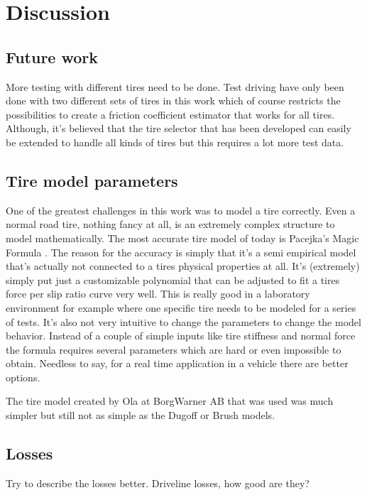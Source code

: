 \chapter{Discussion}

\section{Future work}
More testing with different tires need to be done. Test driving have only been done with two different sets of tires in this work which of course restricts the possibilities to create a friction coefficient estimator that works for all tires. Although, it's believed that the tire selector that has been developed can easily be extended to handle all kinds of tires but this requires a lot more test data.

\section{Tire model parameters}
One of the greatest challenges in this work was to model a tire correctly. Even a normal road tire, nothing fancy at all, is an extremely complex structure to model mathematically. The most accurate tire model of today is Pacejka's Magic Formula \cite{pacejka}. The reason for the accuracy is simply that it's a semi empirical model that's actually not connected to a tires physical properties at all. It's (extremely) simply put just a customizable polynomial that can be adjusted to fit a tires force per slip ratio curve very well. This is really good in a laboratory environment for example where one specific tire needs to be modeled for a series of tests. It's also not very intuitive to change the parameters to change the model behavior. Instead of a couple of simple inputs like tire stiffness and normal force the formula requires several parameters which are hard or even impossible to obtain. Needless to say, for a real time application in a vehicle there are better options.

The tire model created by Ola at BorgWarner AB that was used was much simpler but still not as simple as the Dugoff or Brush models.  


\section{Losses}
Try to describe the losses better. Driveline losses, how good are they?

